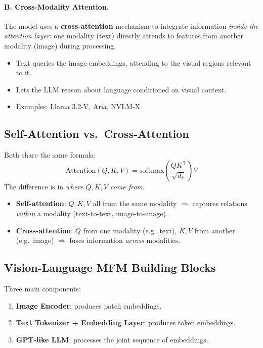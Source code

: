\documentclass[11pt,a4paper]{article}
\theoremstyle{definition}
\theoremstyle{plain}
\theoremstyle{remark}
\begin{document}
\paragraph{B. Cross-Modality Attention.} The model uses a \textbf{cross-attention} mechanism to integrate information \emph{inside the attention layer}: one modality (text) directly attends to features from another modality (image) during processing.
\begin{itemize}
    \item Text queries the image embeddings, attending to the visual regions relevant to it.
    \item Lets the LLM reason about language conditioned on visual content.
    \item Examples: Llama 3.2-V, Aria, NVLM-X.
\end{itemize}

\subsection{Self-Attention vs.\ Cross-Attention}

Both share the same formula:
\[
    \mathrm{Attention}(Q, K, V) = \mathrm{softmax}\!\left(\frac{QK^\top}{\sqrt{d_k}}\right) V
\]
The difference is in \emph{where $Q, K, V$ come from}.
\begin{itemize}
    \item \textbf{Self-attention}: $Q, K, V$ all from the same modality $\Rightarrow$ captures relations \emph{within} a modality (text-to-text, image-to-image).
    \item \textbf{Cross-attention}: $Q$ from one modality (e.g.\ text), $K, V$ from another (e.g.\ image) $\Rightarrow$ fuses information \emph{across} modalities.
\end{itemize}

\subsection{Vision-Language MFM Building Blocks}

Three main components:
\begin{enumerate}
    \item \textbf{Image Encoder}: produces patch embeddings.
    \item \textbf{Text Tokenizer + Embedding Layer}: produces token embeddings.
    \item \textbf{GPT-like LLM}: processes the joint sequence of embeddings.
\end{enumerate}
\end{document}
